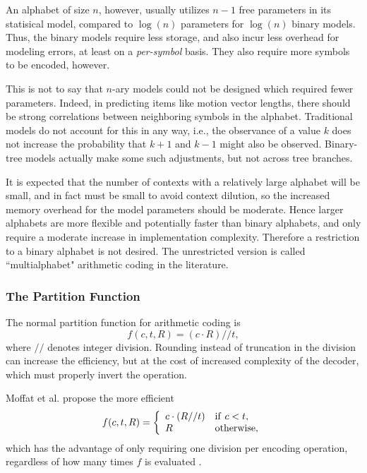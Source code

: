 \documentclass[11pt,letterpaper]{article}
\begin{document}
An alphabet of size $n$, however, usually utilizes $n-1$ free parameters in its
 statisical model, compared to $\log(n)$ parameters for $\log(n)$ binary
 models.
Thus, the binary models require less storage, and also incur less overhead for
 modeling errors, at least on a \textit{per-symbol} basis.
They also require more symbols to be encoded, however.

This is not to say that $n$-ary models could not be designed which required
 fewer parameters.
Indeed, in predicting items like motion vector lengths, there should be strong
 correlations between neighboring symbols in the alphabet.
Traditional models do not account for this in any way, i.e., the observance of
 a value $k$ does not increase the probability that $k+1$ and $k-1$ might also
 be observed.
Binary-tree models actually make some such adjustments, but not across tree
 branches.

It is expected that the number of contexts with a relatively large alphabet
 will be small, and in fact must be small to avoid context dilution, so the
 increased memory overhead for the model parameters should be moderate.
Hence larger alphabets are more flexible and potentially faster than binary
 alphabets, and only require a moderate increase in implementation complexity.
Therefore a restriction to a binary alphabet is not desired.
The unrestricted version is called ``multialphabet" arithmetic coding in the
 literature.

\subsubsection{The Partition Function}

The normal partition function for arithmetic coding is
\begin{displaymath}
 f(c,t,R)=(c\cdot R)//t,
\end{displaymath}
 where $//$ denotes integer division.
Rounding instead of truncation in the division can increase the efficiency, but
 at the cost of increased complexity of the decoder, which must properly invert
 the operation.

Moffat et al. propose the more efficient
\begin{displaymath}
 f(c,t,R)=\left\{
 \begin{array}{ll}c\cdot(R//t)&{\rm if\ }c<t,\\R&{\rm otherwise},\end{array}
 \right.
\end{displaymath}
 which has the advantage of only requiring one division per encoding operation,
 regardless of how many times $f$ is evaluated \cite{MNW98}.
\end{document}
